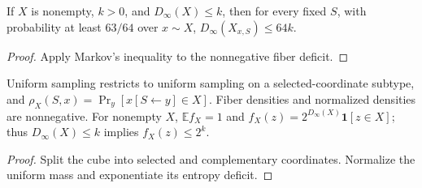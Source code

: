 \begin{corollary}
  \label{cor:analysis-good-fiber}
  \leanok
  If $X$ is nonempty, $k>0$, and $D_\infty(X)\le k$, then for every fixed
  $S$, with probability at least $63/64$ over $x\sim X$,
  $D_\infty(X_{x,S})\le64k$.
\end{corollary}
\begin{proof}
  \leanok
  Apply Markov's inequality to the nonnegative fiber deficit.
\end{proof}


\begin{theorem}
  \label{thm:analysis-resampling-density}
  \leanok
  Uniform sampling restricts to uniform sampling on a selected-coordinate
  subtype, and $\rho_X(S,x)=\Pr_y[x[S\leftarrow y]\in X]$.
  Fiber densities and normalized densities are nonnegative.
  For nonempty $X$, $\mathbb E f_X=1$ and
  $f_X(z)=2^{D_\infty(X)}\mathbf1[z\in X]$; thus
  $D_\infty(X)\le k$ implies $f_X(z)\le2^k$.
\end{theorem}
\begin{proof}
  \leanok
  Split the cube into selected and complementary coordinates. Normalize
  the uniform mass and exponentiate its entropy deficit.
\end{proof}

